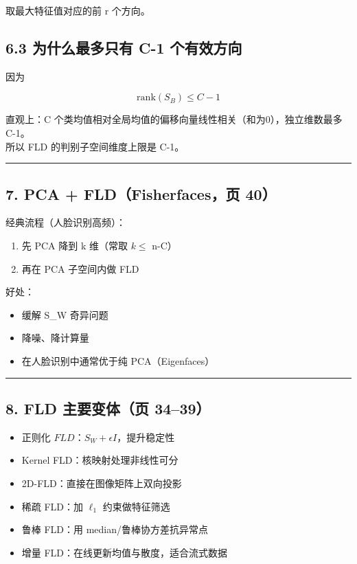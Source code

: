 {{取最大特征值对应的前 r 个方向。

\subsection{6.3 为什么最多只有 C-1
个有效方向}\label{ux4e3aux4ec0ux4e48ux6700ux591aux53eaux6709-c-1-ux4e2aux6709ux6548ux65b9ux5411}

因为

\[
\mathrm{rank}(S_B)\le C-1
\]

直观上：C 个类均值相对全局均值的偏移向量线性相关（和为0），独立维数最多
C-1。\\
所以 FLD 的判别子空间维度上限是 C-1。

\begin{center}\rule{0.5\linewidth}{0.5pt}\end{center}

\subsection{7. PCA + FLD（Fisherfaces，页
40）}\label{pca-fldfisherfacesux9875-40}

经典流程（人脸识别高频）：

\begin{enumerate}
\def\labelenumi{\arabic{enumi}.}
\tightlist
\item
  先 PCA 降到 k 维（常取 \(k\le\) n-C）\\
\item
  再在 PCA 子空间内做 FLD
\end{enumerate}

好处：

\begin{itemize}
\tightlist
\item
  缓解 S\_W 奇异问题
\item
  降噪、降计算量
\item
  在人脸识别中通常优于纯 PCA（Eigenfaces）
\end{itemize}

\begin{center}\rule{0.5\linewidth}{0.5pt}\end{center}

\subsection{8. FLD 主要变体（页
34--39）}\label{fld-ux4e3bux8981ux53d8ux4f53ux9875-3439}

\begin{itemize}
\tightlist
\item
  正则化 \(FLD\)：\(S_W+\epsilon I\)，提升稳定性
\item
  Kernel FLD：核映射处理非线性可分
\item
  2D-FLD：直接在图像矩阵上双向投影
\item
  稀疏 FLD：加 \(\ell_1\) 约束做特征筛选
\item
  鲁棒 FLD：用 median/鲁棒协方差抗异常点
\item
  增量 FLD：在线更新均值与散度，适合流式数据
\end{itemize}

}}
